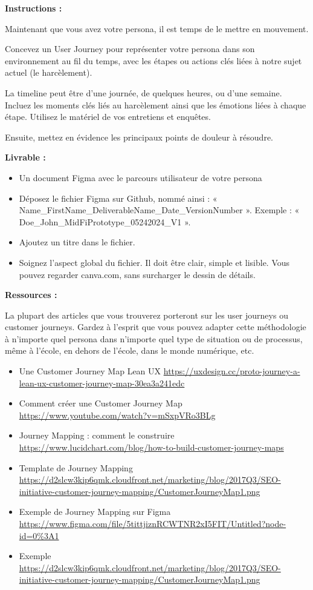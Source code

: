 \makeheaderfiles

\textbf{Instructions :}

Maintenant que vous avez votre persona, il est temps de le mettre en mouvement.

Concevez un User Journey pour représenter votre persona dans son environnement au fil du temps, avec les étapes ou actions clés liées à notre sujet actuel (le harcèlement).

La timeline peut être d'une journée, de quelques heures, ou d'une semaine. Incluez les moments clés liés au harcèlement ainsi que les émotions liées à chaque étape. Utilisez le matériel de vos entretiens et enquêtes.

Ensuite, mettez en évidence les principaux points de douleur à résoudre.

\textbf{Livrable :}

\begin{itemize}
\item Un document Figma avec le parcours utilisateur de votre persona
\item Déposez le fichier Figma sur Github, nommé ainsi : « Name\_FirstName\_DeliverableName\_Date\_VersionNumber ». Exemple : « Doe\_John\_MidFiPrototype\_05242024\_V1 ».
\item Ajoutez un titre dans le fichier.
\item Soignez l'aspect global du fichier. Il doit être clair, simple et lisible. Vous pouvez regarder canva.com, sans surcharger le dessin de détails.
\end{itemize}

\textbf{Ressources :}

La plupart des articles que vous trouverez porteront sur les user journeys ou customer journeys. Gardez à l'esprit que vous pouvez adapter cette méthodologie à n'importe quel persona dans n'importe quel type de situation ou de processus, même à l'école, en dehors de l'école, dans le monde numérique, etc.

\begin{itemize}
\item Une Customer Journey Map Lean UX \url{https://uxdesign.cc/proto-journey-a-lean-ux-customer-journey-map-30ea3a241edc}
\item Comment créer une Customer Journey Map \url{https://www.youtube.com/watch?v=mSxpVRo3BLg}
\item Journey Mapping : comment le construire \url{https://www.lucidchart.com/blog/how-to-build-customer-journey-maps}
\item Template de Journey Mapping \url{https://d2slcw3kip6qmk.cloudfront.net/marketing/blog/2017Q3/SEO-initiative-customer-journey-mapping/CustomerJourneyMap1.png}
\item Exemple de Journey Mapping sur Figma \url{https://www.figma.com/file/5tittjiznRCWTNR2xI5FIT/Untitled?node-id=0%3A1}
\item Exemple \url{https://d2slcw3kip6qmk.cloudfront.net/marketing/blog/2017Q3/SEO-initiative-customer-journey-mapping/CustomerJourneyMap1.png}
\end{itemize}

